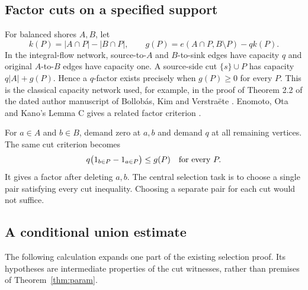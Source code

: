 \documentclass[11pt]{article}
\begin{document}
\subsection{Factor cuts on a specified support}
For balanced shores $A,B$, let
\[
 k(P)=|A\cap P|-|B\cap P|,\qquad
 g(P)=e(A\cap P,B\setminus P)-qk(P).
\]
In the integral-flow network, source-to-$A$ and $B$-to-sink edges have capacity $q$ and original $A$-to-$B$ edges have capacity one. A source-side cut $\{s\}\cup P$ has capacity $q|A|+g(P)$. Hence a $q$-factor exists precisely when $g(P)\ge0$ for every $P$. This is the classical capacity network used, for example, in the proof of Theorem 2.2 of the dated author manuscript of Bollob\'as, Kim and Verstra\"ete \cite{BKV}. Enomoto, Ota and Kano's Lemma C gives a related factor criterion \cite{EOK}.

For $a\in A$ and $b\in B$, demand zero at $a,b$ and demand $q$ at all remaining vertices. The same cut criterion becomes
\begin{equation}\label{eq:omission}
 q\bigl({\rm1}_{b\in P}-{\rm1}_{a\in P}\bigr)\le g(P)
 \quad\hbox{for every }P.
\end{equation}
It gives a factor after deleting $a,b$. The central selection task is to choose a single pair satisfying every cut inequality. Choosing a separate pair for each cut would not suffice.

\subsection{A conditional union estimate}
The following calculation expands one part of the existing selection proof. Its hypotheses are intermediate properties of the cut witnesses, rather than premises of Theorem~\ref{thm:param}.
\end{document}
